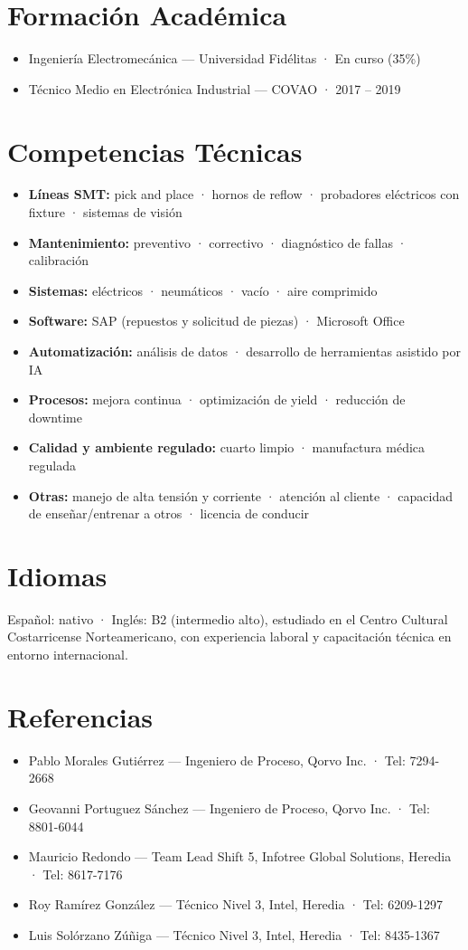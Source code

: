 \documentclass[10.5pt]{article}
\begin{document}
\section*{Formación Académica}
\begin{itemize}
\item Ingeniería Electromecánica --- Universidad Fidélitas · En curso (35\%)
\item Técnico Medio en Electrónica Industrial --- COVAO · 2017 -- 2019
\end{itemize}

\section*{Competencias Técnicas}
\begin{itemize}
\item \textbf{Líneas SMT:} pick and place · hornos de reflow · probadores eléctricos con fixture · sistemas de visión
\item \textbf{Mantenimiento:} preventivo · correctivo · diagnóstico de fallas · calibración
\item \textbf{Sistemas:} eléctricos · neumáticos · vacío · aire comprimido
\item \textbf{Software:} SAP (repuestos y solicitud de piezas) · Microsoft Office
\item \textbf{Automatización:} análisis de datos · desarrollo de herramientas asistido por IA
\item \textbf{Procesos:} mejora continua · optimización de yield · reducción de downtime
\item \textbf{Calidad y ambiente regulado:} cuarto limpio · manufactura médica regulada
\item \textbf{Otras:} manejo de alta tensión y corriente · atención al cliente · capacidad de enseñar/entrenar a otros · licencia de conducir
\end{itemize}

\section*{Idiomas}
Español: nativo · Inglés: B2 (intermedio alto), estudiado en el Centro Cultural Costarricense Norteamericano, con experiencia laboral y capacitación técnica en entorno internacional.

\section*{Referencias}
\begin{itemize}
\item Pablo Morales Gutiérrez --- Ingeniero de Proceso, Qorvo Inc. · Tel: 7294-2668
\item Geovanni Portuguez Sánchez --- Ingeniero de Proceso, Qorvo Inc. · Tel: 8801-6044
\item Mauricio Redondo --- Team Lead Shift 5, Infotree Global Solutions, Heredia · Tel: 8617-7176
\item Roy Ramírez González --- Técnico Nivel 3, Intel, Heredia · Tel: 6209-1297
\item Luis Solórzano Zúñiga --- Técnico Nivel 3, Intel, Heredia · Tel: 8435-1367
\end{itemize}
\end{document}
